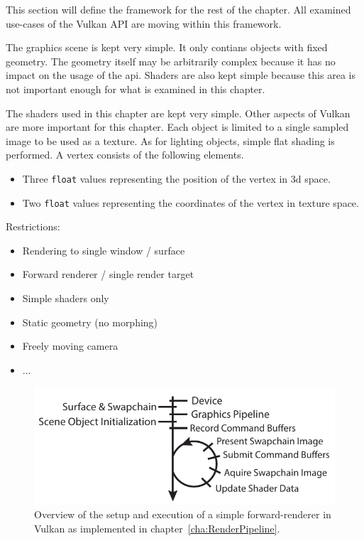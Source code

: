   This section will define the framework for the rest of the chapter.
  All examined use-cases of the Vulkan API are moving within this framework.


  The graphics scene is kept very simple.
  It only contians objects with fixed geometry.
  The geometry itself may be arbitrarily complex because it has no impact on the usage of the \gls{api}.
  Shaders are also kept simple because this area is not important enough for what is examined in this chapter.

  The shaders used in this chapter are kept very simple.
  Other aspects of Vulkan are more important for this chapter.
  Each object is limited to a single sampled image to be used as a texture.
  As for lighting objects, simple flat shading is performed.
  A vertex consists of the following elements.
  \begin{itemize}
    \item Three \lstinline{float} values representing the position of the vertex in \gls{3d} space.
    \item Two \lstinline{float} values representing the coordinates of the vertex in texture space.
  \end{itemize}

  Restrictions:
  \begin{itemize}
    \item Rendering to single window / surface
    \item Forward renderer / single render target
    \item Simple shaders only
    \item Static geometry (no morphing)
    \item Freely moving camera
    \item ...
  \end{itemize}

  \begin{figure}
    \includegraphics{Main/Images/RenderSetupAndLoopSimple}
    \centering
    \caption{Overview of the setup and execution of a simple forward-renderer in Vulkan as implemented in chapter~\ref{cha:RenderPipeline}.}
    \label{fig:RenderSetupAndLoopSimple}
  \end{figure}

